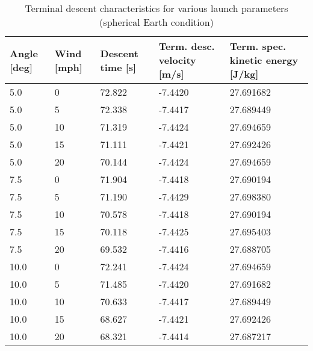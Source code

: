 \begin{table}[H]
    \centering
    \caption{Terminal descent characteristics for various launch parameters (spherical Earth condition)}
    \label{tab:FlightDynamics:TerminalDescentCharacteristics}
    \begin{tabularx}{\linewidth}{lllXX}
    \toprule
     \textbf{Angle [deg]} &  \textbf{Wind [mph]} &  \textbf{Descent time [s]} &  \textbf{Term. desc. velocity [m/s]} &  \textbf{Term. spec. kinetic energy [J/kg]} \\
    \midrule
       5.0 &     0 &        72.822 &               -7.4420 &                   27.691682 \\
       5.0 &     5 &        72.338 &               -7.4417 &                   27.689449 \\
       5.0 &    10 &        71.319 &               -7.4424 &                   27.694659 \\
       5.0 &    15 &        71.111 &               -7.4421 &                   27.692426 \\
       5.0 &    20 &        70.144 &               -7.4424 &                   27.694659 \\
       7.5 &     0 &        71.904 &               -7.4418 &                   27.690194 \\
       7.5 &     5 &        71.190 &               -7.4429 &                   27.698380 \\
       7.5 &    10 &        70.578 &               -7.4418 &                   27.690194 \\
       7.5 &    15 &        70.118 &               -7.4425 &                   27.695403 \\
       7.5 &    20 &        69.532 &               -7.4416 &                   27.688705 \\
      10.0 &     0 &        72.241 &               -7.4424 &                   27.694659 \\
      10.0 &     5 &        71.485 &               -7.4420 &                   27.691682 \\
      10.0 &    10 &        70.633 &               -7.4417 &                   27.689449 \\
      10.0 &    15 &        68.627 &               -7.4421 &                   27.692426 \\
      10.0 &    20 &        68.321 &               -7.4414 &                   27.687217 \\
    \bottomrule
    \end{tabularx}
\end{table}
